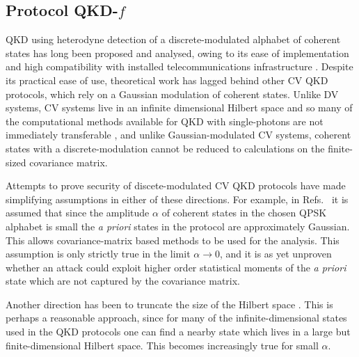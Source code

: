 \subsection{Protocol QKD-$f$}
QKD using heterodyne detection of a discrete-modulated alphabet of coherent states has long been proposed and analysed, owing to its ease of implementation and high compatibility with installed telecommunications infrastructure \cite{Leverrier2011, Papanastasiou2018, Zhao2009, Bradler2018, Ghorai2019, Lin2019}. Despite its practical ease of use, theoretical work has lagged behind other CV QKD protocols, which rely on a Gaussian modulation of coherent states. Unlike DV systems, CV systems live in an infinite dimensional Hilbert space and so many of the computational methods available for QKD with single-photons are not immediately transferable \cite{Tomamichel2012a}, and unlike Gaussian-modulated CV systems, coherent states with a discrete-modulation cannot be reduced to calculations on the finite-sized covariance matrix.  %

Attempts to prove security of discete-modulated CV QKD protocols have made simplifying assumptions in either of these directions. For example, in Refs.~\cite{Leverrier2011, Ghorai2019, Lin2019} it is assumed that since the amplitude $\alpha$ of coherent states in the chosen QPSK alphabet is small the \emph{a priori} states in the protocol are approximately Gaussian. This allows covariance-matrix based methods to be used for the analysis. This assumption is only strictly true in the limit $\alpha \rightarrow 0$, and it is as yet unproven whether an attack could exploit higher order statistical moments of the \emph{a priori} state which are not captured by the covariance matrix.


Another direction has been to truncate the size of the Hilbert space \cite{Ghorai2019, Lin2019, Papanastasiou2018}. This is perhaps a reasonable approach, since for many of the infinite-dimensional states used in the QKD protocols one can find a nearby state which lives in a large but finite-dimensional Hilbert space. This becomes increasingly true for small $\alpha$. 

